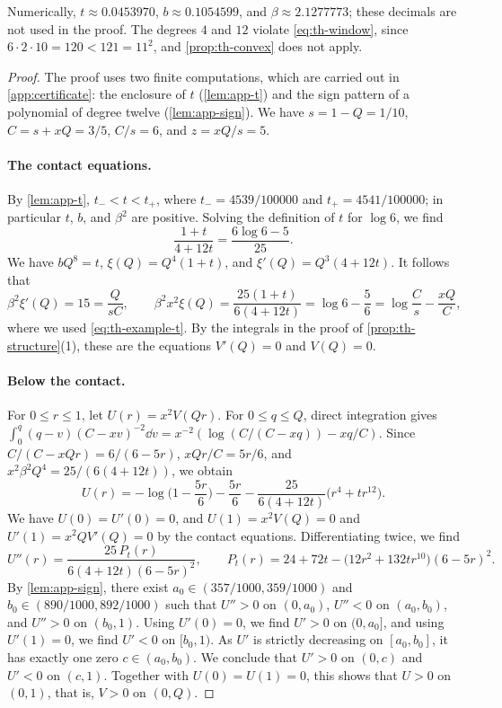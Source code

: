 Numerically, $t\approx0.0453970$, $b\approx0.1054599$, and $\beta\approx2.1277773$; these decimals are not used in the proof. The degrees $4$ and $12$ violate \eqref{eq:th-window}, since $6\cdot2\cdot10=120<121=11^2$, and \cref{prop:th-convex} does not apply.

\begin{proof}
The proof uses two finite computations, which are carried out in \cref{app:certificate}: the enclosure of $t$ (\cref{lem:app-t}) and the sign pattern of a polynomial of degree twelve (\cref{lem:app-sign}). We have $s=1-Q=1/10$, $C=s+xQ=3/5$, $C/s=6$, and $z=xQ/s=5$.

\paragraph{The contact equations.}
By \cref{lem:app-t}, $t_-<t<t_+$, where $t_-=4539/100000$ and $t_+=4541/100000$; in particular $t$, $b$, and $\beta^2$ are positive. Solving the definition of $t$ for $\log6$, we find
\begin{equation}\label{eq:th-example-t}
\frac{1+t}{4+12t}=\frac{6\log6-5}{25}.
\end{equation}
We have $bQ^8=t$, $\xi(Q)=Q^4(1+t)$, and $\xi'(Q)=Q^3(4+12t)$. It follows that
\[
\beta^2\xi'(Q)=15=\frac Q{sC},\qquad\beta^2x^2\xi(Q)=\frac{25(1+t)}{6(4+12t)}=\log6-\frac56=\log\frac Cs-\frac{xQ}C,
\]
where we used \eqref{eq:th-example-t}. By the integrals in the proof of \cref{prop:th-structure}(1), these are the equations $V'(Q)=0$ and $V(Q)=0$.

\paragraph{Below the contact.}
For $0\le r\le1$, let $U(r)=x^2V(Qr)$. For $0\le q\le Q$, direct integration gives $\int_0^q(q-v)(C-xv)^{-2}\dd v=x^{-2}(\log(C/(C-xq))-xq/C)$. Since $C/(C-xQr)=6/(6-5r)$, $xQr/C=5r/6$, and $x^2\beta^2Q^4=25/(6(4+12t))$, we obtain
\begin{equation}\label{eq:th-example-U}
U(r)=-\log\Big(1-\frac{5r}6\Big)-\frac{5r}6-\frac{25}{6(4+12t)}\big(r^4+tr^{12}\big).
\end{equation}
We have $U(0)=U'(0)=0$, and $U(1)=x^2V(Q)=0$ and $U'(1)=x^2QV'(Q)=0$ by the contact equations. Differentiating twice, we find
\begin{equation}\label{eq:th-example-U2}
U''(r)=\frac{25\,P_t(r)}{6(4+12t)(6-5r)^2},\qquad P_t(r)=24+72t-\big(12r^2+132tr^{10}\big)(6-5r)^2.
\end{equation}
By \cref{lem:app-sign}, there exist $a_0\in(357/1000,359/1000)$ and $b_0\in(890/1000,892/1000)$ such that $U''>0$ on $(0,a_0)$, $U''<0$ on $(a_0,b_0)$, and $U''>0$ on $(b_0,1)$. Using $U'(0)=0$, we find $U'>0$ on $(0,a_0]$, and using $U'(1)=0$, we find $U'<0$ on $[b_0,1)$. As $U'$ is strictly decreasing on $[a_0,b_0]$, it has exactly one zero $c\in(a_0,b_0)$. We conclude that $U'>0$ on $(0,c)$ and $U'<0$ on $(c,1)$. Together with $U(0)=U(1)=0$, this shows that $U>0$ on $(0,1)$, that is, $V>0$ on $(0,Q)$.


\end{proof}

